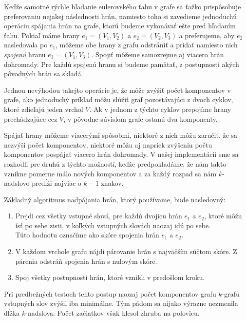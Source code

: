 Keďže samotné rýchle hľadanie eulerovského ťahu v grafe sa ťažko prispôsobuje
preferovaniu nejakej následnosti hrán, namiesto toho si zavedieme jednoduchú
operáciu spájania hrán na grafe, ktorú budeme vykonávať ešte pred hľadaním ťahu. Pokiaľ
máme hrany $e_1 = (V_1, V_2)$ a $e_2 = (V_2, V_3)$ a preferujeme, aby $e_2$
nasledovala po $e_1$, môžeme obe hrany z grafu odstrániť a pridať namiesto nich \emph{spojenú}
hranu $e_3 = (V_1, V_3)$. Spojiť môžeme samozrejme aj viacero hrán dohromady. Pre
každú spojenú hranu si budeme pamätať, z postupnosti akých pôvodných hrán sa
skladá.

Jednou nevýhodou takejto operácie je, že môže zvýšiť počet komponentov v grafe,
ako jednoduchý príklad môžu slúžiť graf pozostávajúci z dvoch cyklov, ktoré
zdieľajú jeden vrchol $V$. Ak v jednom z týchto cyklov prepojíme hrany
prechádzajúce cez $V$, v pôvodne súvislom grafe ostanú dva komponenty.

Spájať hrany môžeme viacerými spôsobmi, niektoré z nich môžu zaručiť, že sa
nezvýši počet komponentov, niektoré môžu aj napriek zvýšeniu počtu komponentov
pospájať viacero hrán dohromady. V našej implementácii sme sa rozhodli pre druhú
z týchto možností, keďže predpokladáme, že nám takto vznikne pomerne málo nových
komponentov a za každý rozpad sa nám $k$-nadslovo predĺži najviac o $k-1$ znakov.

Základný algoritmus nadpájania hrán, ktorý používame, bude nasledovný:
\begin{enumerate}
    \item Prejdi cez všetky vstupné slová, pre každú dvojicu hrán $e_1$ a $e_2$, ktoré
          môžu ísť po sebe zisti, v koľkých vstupných slovách naozaj idú po sebe.\\
          Túto hodnotu označíme ako skóre spojenia hrán $e_1$ a $e_2$.
    \item V každom vrchole grafu nájdi párovanie hrán s najväčším súčtom skóre. Z
          párenia odstráň spojenia hrán s nulovým skóre.
    \item Spoj všetky postupnosti hrán, ktoré vznikli v predošlom kroku.
\end{enumerate}

Pri predbežných testoch tento postup naozaj počet
komponentov grafu $k$-grafu vstupných slov zvýšil iba minimálne. Tým pádom
sa nijako výrazne nezmenila dĺžka $k$-nadslova.
Počet začiatkov však klesol zhruba na polovicu.
